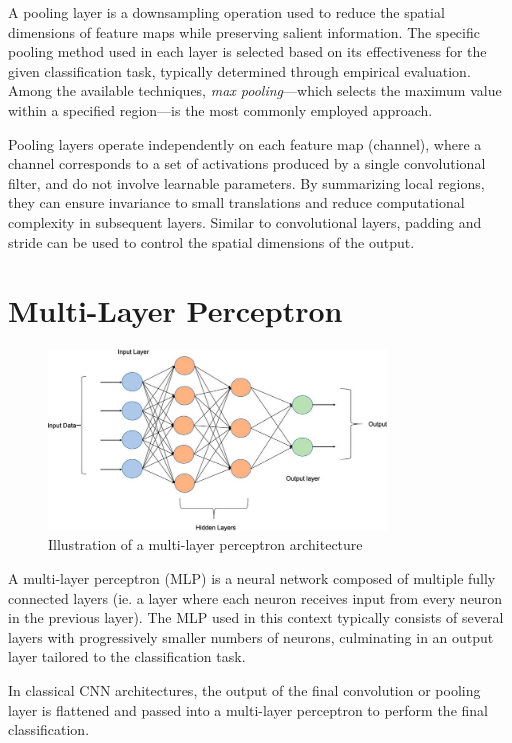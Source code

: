\documentclass{pracalicmgr}
\begin{document}
A pooling layer is a downsampling operation used to reduce the spatial dimensions of feature maps while preserving salient information. The specific pooling method used in each layer is selected based on its effectiveness for the given classification task, typically determined through empirical evaluation. Among the available techniques, \textit{max pooling}—which selects the maximum value within a specified region—is the most commonly employed approach.

Pooling layers operate independently on each feature map (channel), where a channel corresponds to a set of activations produced by a single convolutional filter, and do not involve learnable parameters. By summarizing local regions, they can ensure invariance to small translations and reduce computational complexity in subsequent layers. Similar to convolutional layers, padding and stride can be used to control the spatial dimensions of the output.

\section{Multi-Layer Perceptron}

\begin{figure}[H]
\centering
\includegraphics[width=0.8\textwidth]{src/mlp.jpg}
\caption{Illustration of a multi-layer perceptron architecture\cite{mplGraphEG}}
\end{figure}

A multi-layer perceptron (MLP) is a neural network composed of multiple fully connected layers (ie. a layer where each neuron receives input from every neuron in the previous layer). The MLP used in this context typically consists of several layers with progressively smaller numbers of neurons, culminating in an output layer tailored to the classification task.

In classical CNN architectures, the output of the final convolution or pooling layer is flattened and passed into a multi-layer perceptron to perform the final classification.
\end{document}

